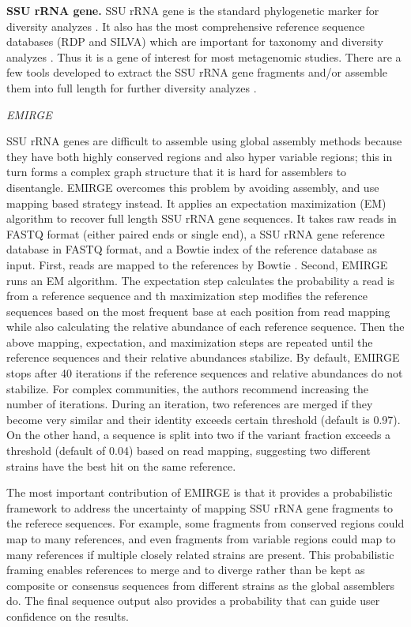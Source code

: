 \documentclass[]{msu-thesis}
\begin{document}
\textbf{SSU rRNA gene. } SSU rRNA gene is the standard
phylogenetic marker for diversity analyzes
\cite{lane_rapid_1985,huse_exploring_2008}. It also has the most comprehensive
reference sequence databases (RDP and SILVA) which are important
for taxonomy and diversity analyzes
\cite{cole_ribosomal_2014,quast_silva_2013}. Thus it is a gene of
interest for most metagenomic studies. There are a few tools developed
to extract the SSU rRNA gene fragments and/or assemble them into full
length for further diversity analyzes
\cite{miller_emirge:_2011,yuan_reconstructing_2015,guo_microbial_2015}.

\textit{EMIRGE}

SSU rRNA genes are difficult to assemble using global assembly methods
because they have both highly conserved regions and also hyper variable
regions; this in turn forms a complex graph structure that it is hard
for assemblers to disentangle. EMIRGE overcomes this problem by
avoiding assembly, and use mapping based strategy instead. It applies
an expectation maximization (EM) algorithm to recover full length SSU
rRNA gene sequences. It takes raw reads in FASTQ format (either
paired ends or single end), a SSU rRNA gene reference database in
FASTQ format, and a Bowtie index of the reference database as
input. First, reads are mapped to the references by Bowtie
\cite{langmead_aligning_2010}. Second, EMIRGE runs an EM algorithm.
The expectation step
calculates the probability a read is from a reference sequence and th
maximization step modifies the reference sequences based on the most
frequent base at each position from read mapping while also calculating
the relative abundance of each reference sequence. Then the above
mapping, expectation, and maximization steps are repeated until the
reference sequences and their relative abundances stabilize. By
default, EMIRGE stops after 40 iterations if the reference sequences and
relative abundances do not stabilize. For complex communities, the authors
recommend increasing the number of iterations. During an iteration,
two references are merged if they become very similar and their
identity exceeds certain threshold (default is 0.97). On the other
hand, a sequence is split into two if the variant fraction exceeds a threshold (default of 0.04) based
on read mapping, suggesting two different strains have the best hit on
the same reference.

The most important contribution of EMIRGE is that it provides a
probabilistic framework to address the uncertainty of mapping SSU rRNA
gene fragments to the referece sequences. For example, some fragments
from conserved regions could map to many references, and even
fragments from variable regions could map to many references if
multiple closely related strains are present.
This probabilistic framing enables references
to merge and to diverge rather than be kept as composite or
consensus sequences from different strains as the global assemblers
do. The final sequence output also provides a probability that can guide
user confidence on the results.
\end{document}
